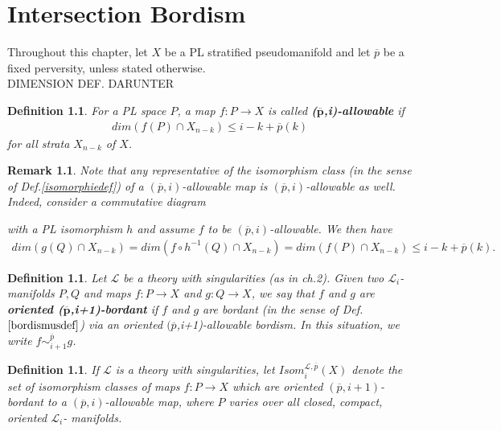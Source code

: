 \documentclass{scrreprt}
\newtheorem{definition}[prop]{Definition}
\newtheorem{remark}[prop]{Remark}
\begin{document}
\chapter{Intersection Bordism}
Throughout this chapter, let $X$ be a PL stratified pseudomanifold and let $\overline{p}$ be a fixed perversity, unless stated otherwise. \\ 

DIMENSION DEF. DARUNTER
 
\begin{definition}
For a PL space $P$, a map $f: P \to X$ is called \textbf{($\boldsymbol{\overline{p}}$,i)-allowable} if 
\begin{align*}
dim(f(P) \cap X_{n-k}) \leq i-k+ \overline{p}(k)
\end{align*}
for all strata $X_{n-k}$ of $X$.
\end{definition}

\begin{remark}
Note that any representative of the isomorphism class (in the sense of Def.\ref{isomorphiedef}) of a $(\overline{p},i)$-allowable map is $(\overline{p},i)$-allowable as well. Indeed, consider a commutative diagram
\begin{xy}
\end{xy}
with a PL isomorphism $h$ and assume $f$ to be $(\overline{p},i)$-allowable. We then have
\begin{align*}
dim(g(Q) \cap X_{n-k}) = dim(f \circ h^{-1} (Q) \cap X_{n-k})=dim(f(P) \cap X_{n-k}) \leq i-k+ \overline{p}(k).
\end{align*}
\end{remark}

\begin{definition}
Let $\mathcal{L}$ be a theory with singularities (as in ch.2). Given two $\mathcal{L}_i$-manifolds $P,Q$ and maps $f: P \to X$ and $g: Q \to X$, we say that $f$ and $g$ are \textbf{oriented ($\boldsymbol{\overline{p}}$,i+1)-bordant} if $f$ and $g$ are bordant (in the sense of Def.$\ref{bordismusdef}$) via an oriented $({\overline{p}}$,i+1)-allowable bordism. In this situation, we write $f \sim_{i+1}^{\overline{p}} g$.
\end{definition}

\begin{definition}
If $\mathcal{L}$ is a theory with singularities, let $Isom_i^{\mathcal{L}, \overline{p}}(X)$ denote the set of isomorphism classes of maps $f: P \to X$ which are oriented $(\overline{p},i+1)$-bordant to a $(\overline{p},i)$-allowable map, where $P$ varies over all closed, compact, oriented $\mathcal{L}_i$- manifolds.
\end{definition}
\end{document}
